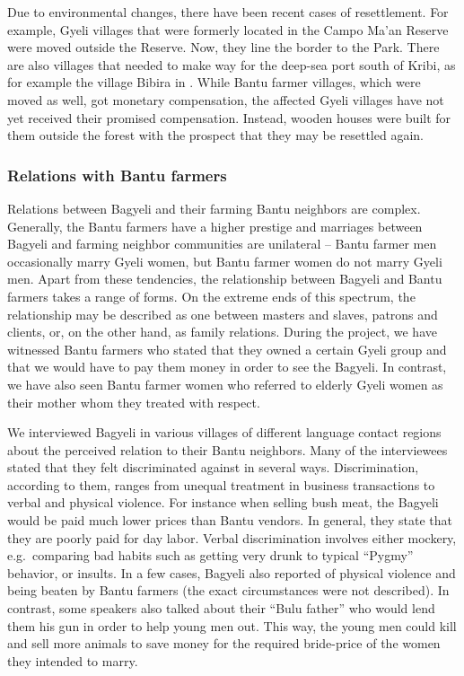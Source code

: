 Due to environmental changes, there have been recent cases of resettlement. For example, Gyeli villages that were formerly located in the Campo Ma'an Reserve were moved outside the Reserve. Now, they line the border to the Park. There are also villages that needed to make way for the deep-sea port south of Kribi, as for example the village Bibira in . While Bantu farmer villages, which were moved as well, got monetary compensation, the affected Gyeli villages have not yet received their promised compensation. Instead, wooden houses were built for them outside the forest with the prospect that they may be resettled again.



\subsubsection*{Relations with Bantu farmers}
Relations between Bagyeli and their farming Bantu neighbors are complex. Generally, the Bantu farmers have a higher prestige and marriages between Bagyeli and farming neighbor communities are unilateral -- Bantu farmer men occasionally marry Gyeli women, but Bantu farmer women do not marry Gyeli men. Apart from these tendencies, the relationship between Bagyeli and Bantu farmers takes a range of forms. On the extreme ends of this spectrum, the relationship may be described as one between masters and slaves, patrons and clients, or, on the other hand, as family relations. During the project, we have witnessed Bantu farmers who stated that they owned a certain Gyeli group and that we would have to pay them money in order to see the Bagyeli. In contrast, we have also seen Bantu farmer women who referred to elderly Gyeli women as their mother whom they treated with respect.

We interviewed Bagyeli in various villages of different language contact regions about the perceived relation to their Bantu neighbors. Many of the interviewees stated that they felt discriminated against in several ways. Discrimination, according to them, ranges from unequal treatment in business transactions to verbal and physical violence. For instance when selling bush meat, the Bagyeli would be paid much lower prices than Bantu vendors. In general, they state that they are poorly paid for day labor. Verbal discrimination involves either mockery, e.g.\ comparing bad habits such as getting very drunk to typical ``Pygmy'' behavior, or insults. In a few cases, Bagyeli also reported of physical violence and being beaten by Bantu farmers (the exact circumstances were not described). In contrast, some speakers also talked about their ``Bulu father'' who would lend them his gun in order to help young men out. This way, the young men could kill and sell more animals to save money for the required bride-price of the women they intended to marry.

